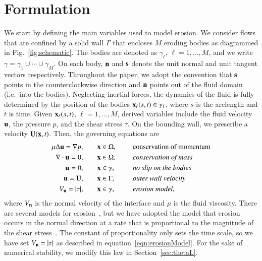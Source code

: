 \documentclass[preprint, 10pt]{elsarticle}
\begin{document}
\section{Formulation}
\label{s:formulation}
We start by defining the main variables used to model erosion.  We
consider flows that are confined by a solid wall $\Gamma$ that encloses
$M$ eroding bodies as diagrammed in Fig.~\ref{fig:schematic}.  The
bodies are denoted as $\gamma_\ell$, $\ell=1,\ldots,M$, and we write
$\gamma = \gamma_1 \cup \cdots \cup \gamma_M$.  On each body, $\nn$ and
$\ss$ denote the unit normal and unit tangent vectors respectively.
Throughout the paper, we adopt the convention that $\ss$ points in the
counterclockwise direction and $\nn$ points out of the fluid domain
(i.e.~into the bodies). Neglecting inertial forces, the dynamics of the
fluid is fully determined by the position of the bodies $\xx_\ell(s,t)
\in \gamma_\ell$, where $s$ is the arclength and $t$ is time.  Given
$\xx_\ell(s,t)$, $\ell=1,\ldots,M$, derived variables include the fluid
velocity $\uu$, the pressure $p$, and the shear stress $\tau$.   On the
bounding wall, we prescribe a velocity $\UU(\xx,t)$.  Then, the
governing equations are
\begin{equation}
\label{eqn:erosionModel}
\begin{split}
  \mu \Delta \uu = \grad p, &\hspace{20pt} \xx \in \Omega, \gap &&\mbox{conservation
of momentum}\\
\grad \cdot \uu = 0, &\hspace{20pt} \xx \in \Omega, \gap
&&\mbox{\em conservation of mass} \\
\uu = 0, &\hspace{20pt} \xx \in \gamma, \gap &&\mbox{\em no slip on the
bodies} \\
\uu = \UU, &\hspace{20pt} \xx \in \Gamma, \gap &&\mbox{\em outer wall
velocity} \\
\Vn = \abs{\tau}, &\hspace{20pt} \xx \in \gamma,
&&\mbox{\em erosion model},
\end{split}
\end{equation}
where $\Vn$ is the normal velocity of the interface and $\mu$ is the
fluid viscosity.  There are several models for
erosion~\cite{par-izu2000,lag2000}, but we have adopted the model that
erosion occurs in the normal direction at a rate that is proportional to
the magnitude of the shear stress~\cite{moo-ris-chi-zha-she2013}.  The
constant of proportionality only sets the time scale, so we have set
$\Vn = |\tau|$ as described in equation~\eqref{eqn:erosionModel}.  For
the sake of numerical stability, we modify this law in
Section~\ref{sec:thetaL}. 
\end{document}
